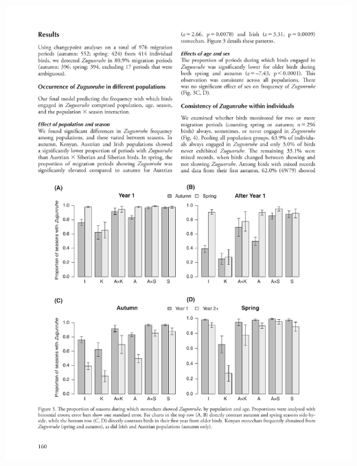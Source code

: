 \documentclass[a4paper, twoside]{templates/ociamthesis}
\begin{document}
\begin{center}\includegraphics[width=1\linewidth]{pdf_chapters/zug/zug_crop_Part06} \end{center}
\end{document}
